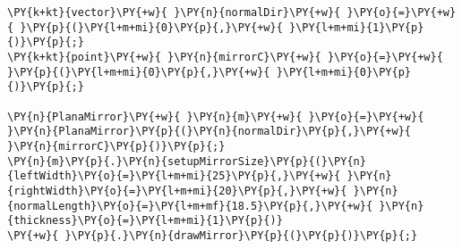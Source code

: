 \begin{Verbatim}[commandchars=\\\{\}]
\PY{k+kt}{vector}\PY{+w}{ }\PY{n}{normalDir}\PY{+w}{ }\PY{o}{=}\PY{+w}{ }\PY{p}{(}\PY{l+m+mi}{0}\PY{p}{,}\PY{+w}{ }\PY{l+m+mi}{1}\PY{p}{)}\PY{p}{;}
\PY{k+kt}{point}\PY{+w}{ }\PY{n}{mirrorC}\PY{+w}{ }\PY{o}{=}\PY{+w}{ }\PY{p}{(}\PY{l+m+mi}{0}\PY{p}{,}\PY{+w}{ }\PY{l+m+mi}{0}\PY{p}{)}\PY{p}{;}

\PY{n}{PlanaMirror}\PY{+w}{ }\PY{n}{m}\PY{+w}{ }\PY{o}{=}\PY{+w}{ }\PY{n}{PlanaMirror}\PY{p}{(}\PY{n}{normalDir}\PY{p}{,}\PY{+w}{ }\PY{n}{mirrorC}\PY{p}{)}\PY{p}{;}
\PY{n}{m}\PY{p}{.}\PY{n}{setupMirrorSize}\PY{p}{(}\PY{n}{leftWidth}\PY{o}{=}\PY{l+m+mi}{25}\PY{p}{,}\PY{+w}{ }\PY{n}{rightWidth}\PY{o}{=}\PY{l+m+mi}{20}\PY{p}{,}\PY{+w}{ }\PY{n}{normalLength}\PY{o}{=}\PY{l+m+mf}{18.5}\PY{p}{,}\PY{+w}{ }\PY{n}{thickness}\PY{o}{=}\PY{l+m+mi}{1}\PY{p}{)}
\PY{+w}{ }\PY{p}{.}\PY{n}{drawMirror}\PY{p}{(}\PY{p}{)}\PY{p}{;}
\end{Verbatim}
